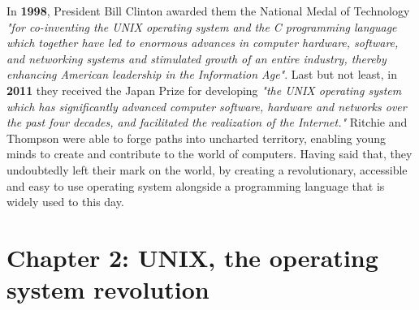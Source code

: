 \documentclass[12pt]{article}
\begin{document}
In \textbf{1998}, President Bill Clinton awarded them the National Medal of Technology \textit{"for co-inventing the UNIX operating system and the C programming language which together have led to enormous advances in computer hardware, software, and networking systems and stimulated growth of an entire industry, thereby enhancing American leadership in the Information Age"}.\newline\newline
Last but not least, in \textbf{2011} they received the Japan Prize for developing \textit{"the UNIX operating system which has significantly advanced computer software, hardware and networks over the past four decades, and facilitated the realization of the Internet."}\newline\newline
Ritchie and Thompson were able to forge paths into uncharted territory, enabling young minds to create and contribute to the world of computers. Having said that, they undoubtedly left their mark on the world, by creating a revolutionary, accessible and easy to use operating system alongside a programming language that is widely used to this day.

\newpage

\section{Chapter 2: UNIX, the operating system revolution}
\end{document}
